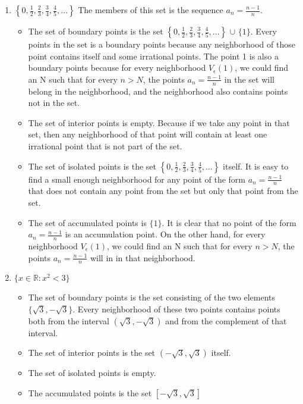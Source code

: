 \begin{enumerate}[label={(\arabic*)}]
    \item  \(\left\{0, \frac{1}{2}, \frac{2}{3}, \frac{3}{4}, \frac{4}{5}, \dots\right\}\) \newline \newline
    The members of this set is the sequence \(a_n = \frac{n-1}{n}\).
    \begin{itemize}
        \item The set of boundary points is the set \(\left\{0, \frac{1}{2}, \frac{2}{3}, \frac{3}{4}, \frac{4}{5}, \dots\right\}\) \(\cup\) \(\{1\}\). Every points in the set is a boundary points because any neighborhood of those point contains itself and some irrational points. The point 1 is also a boundary points because for every neighborhood \(V_{\epsilon}(1)\), we could find an N such that for every \(n > N\), the points \(a_n = \frac{n-1}{n}\) in the set will belong in the neighborhood, and the neighborhood also contains points not in the set. 
        \item The set of interior points is empty. Because if we take any point in that set, then any neighborhood of that point will contain at least one irrational point that is not part of the set. 
        \item The set of isolated points is the set \(\left\{0, \frac{1}{2}, \frac{2}{3}, \frac{3}{4}, \frac{4}{5}, \dots\right\}\) itself. It is easy to find a small enough neighborhood for any point of the form \(a_n = \frac{n-1}{n}\) that does not contain any point from the set but only that point from the set. 
        \item The set of accumulated points is \(\{1\}\). It is clear that no point of the form \(a_n = \frac{n-1}{n}\) is an accumulation point. On the other hand, for every neighborhood \(V_{\epsilon}(1)\), we could find an N such that for every \(n > N\), the points \(a_n = \frac{n-1}{n}\) will in in that neighborhood. 
    \end{itemize}
    
    
    \item  \(\{x \in \mathbb{R}: x^{2}<3\}\)
    \begin{itemize}
        \item The set of boundary points is the set consisting of the two elements \(\{\sqrt{3}, -\sqrt{3}\}\). Every neighborhood of these two points contains points both from the interval \((\sqrt{3}, -\sqrt{3})\) and from the complement of that interval. 
        \item The set of interior points is the set \((-\sqrt{3}, \sqrt{3})\) itself. 
        \item The set of isolated points is empty.
        \item The accumulated points is the set \([-\sqrt{3}, \sqrt{3}]\)
    \end{itemize}
    

\end{enumerate}
